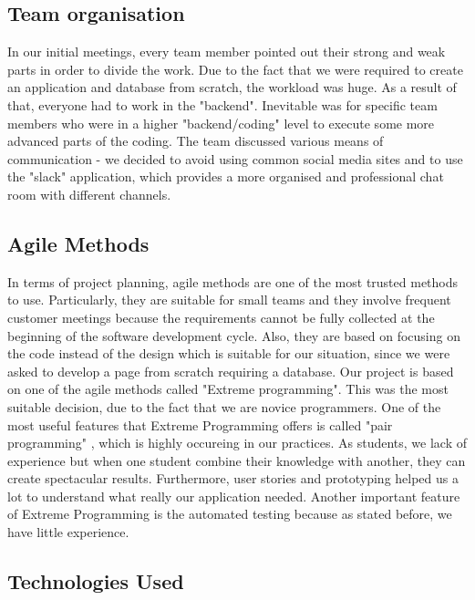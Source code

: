 \documentclass{l3proj}
\begin{document}
\subsection{Team organisation}
\label{organisation}

In our initial meetings, every team member pointed out their strong and weak parts in order to divide the work. Due to the fact that we were required to create an application and database from scratch, the workload was huge. As a result of that, everyone had to work in the "backend". Inevitable was for specific team members who were in a higher "backend/coding" level to execute some more advanced parts of the coding.
The team discussed various means of communication - we decided to avoid using common social media sites and to use the "slack" application, which provides a more organised and professional chat room with different channels. 

\subsection{Agile Methods}
\label{agile}

In terms of project planning, agile methods are one of the most trusted methods to use. Particularly, they are suitable for small teams and they involve frequent customer meetings because the requirements cannot be fully collected at the beginning of the software development cycle. Also, they are based on focusing on the code instead of the design which is suitable for our situation, since we were asked to develop a page from scratch requiring a database. Our project is based on one of the agile methods called "Extreme programming". This was the most suitable decision, due to the fact that we are novice programmers. One of the most useful features that Extreme Programming offers is called "pair programming" , which is highly occureing in our practices. As students, we lack of experience but when one student combine their knowledge with another, they can create spectacular results. Furthermore, user stories and prototyping helped us a lot to understand what really our application needed. Another important feature of Extreme Programming is the automated testing because as stated before, we have little experience.

\subsection{Technologies Used}
\label{tech}
\end{document}
